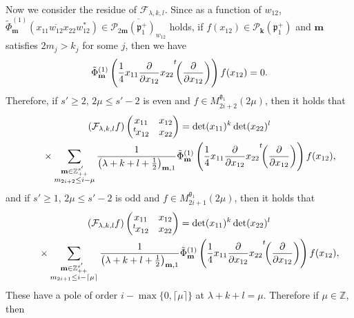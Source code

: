 \documentclass[pdftex]{sigma}
\numberwithin{equation}{section}
\newcommand{\bk}{\mathbf{k}}
\newcommand{\bm}{\mathbf{m}}
\newcommand{\BZ}{\mathbb{Z}}
\newcommand{\fg}{\mathfrak{g}}
\newcommand{\fp}{\mathfrak{p}}
\newcommand{\cF}{\mathcal{F}}
\newcommand{\cP}{\mathcal{P}}
\begin{document}
Now we consider the residue of $\cF_{\lambda,k,l}$. Since as a function of $w_{12}$, $\tilde{\Phi}_\bm^{(1)} (x_{11}\overline{w_{12}}x_{22}w_{12}^* )\in\overline{\cP_{2\bm}(\fp^+_1)_{w_{12}}}$ holds, if $f(x_{12})\in\cP_\bk(\fp^+_1)$ and $\bm$ satisfies $2m_j>k_j$ for some $j$, then we have
\begin{gather*} \tilde{\Phi}_\bm^{(1)}
\left(\frac{1}{4}x_{11}\frac{\partial}{\partial x_{12}}x_{22}{\vphantom{\biggl(}}^t\!\!\left(\frac{\partial}{\partial x_{12}}\right)\right)f(x_{12})=0. \end{gather*}
Therefore, if $s'\ge 2$, $2\mu\le s'-2$ is even and $f\in M_{2i+2}^{\fg_1}(2\mu)$, then it holds that
\begin{gather*}
 (\cF_{\lambda,k,l}f)\begin{pmatrix}x_{11}&x_{12}\\{}^t\hspace{-1pt}x_{12}&x_{22}\end{pmatrix}=\det(x_{11})^k\det(x_{22})^l\\
\qquad{} \times\sum_{\substack{\bm\in\BZ_{++}^{s'}\\ m_{2i+2}\le i-\mu}}\frac{1}{\big(\lambda+k+l+\frac{1}{2}\big)_{\bm,1}}\tilde{\Phi}_\bm^{(1)}
\left(\frac{1}{4}x_{11}\frac{\partial}{\partial x_{12}}x_{22}{\vphantom{\biggl(}}^t\!\!\left(\frac{\partial}{\partial x_{12}}\right)\right)
f(x_{12}),
\end{gather*}
and if $s'\ge 1$, $2\mu\le s'-2$ is odd and $f\in M_{2i+1}^{\fg_1}(2\mu)$, then it holds that
\begin{gather*}
 (\cF_{\lambda,k,l}f)\begin{pmatrix}x_{11}&x_{12}\\{}^t\hspace{-1pt}x_{12}&x_{22}\end{pmatrix}=\det(x_{11})^k\det(x_{22})^l\\
\qquad{}\times\sum_{\substack{\bm\in\BZ_{++}^{s'}\\ m_{2i+1}\le i-\lceil\mu\rceil}}\frac{1}{\big(\lambda+k+l+\frac{1}{2}\big)_{\bm,1}}\tilde{\Phi}_\bm^{(1)}
\left(\frac{1}{4}x_{11}\frac{\partial}{\partial x_{12}}x_{22}{\vphantom{\biggl(}}^t\!\!\left(\frac{\partial}{\partial x_{12}}\right)\right) f(x_{12}),
\end{gather*}
These have a pole of order $i-\max\{0,\lceil \mu\rceil\}$ at $\lambda+k+l=\mu$. Therefore if $\mu\in\BZ$, then
\end{document}
